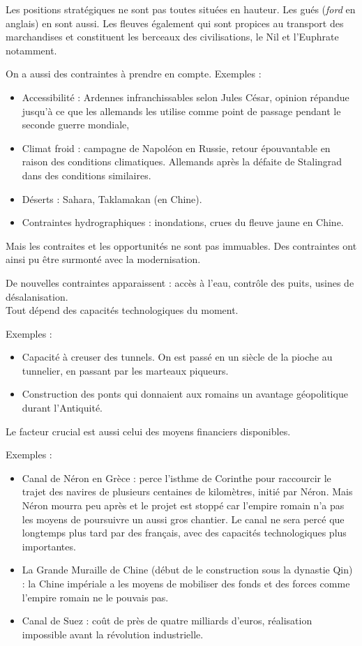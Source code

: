 \documentclass[a4paper,10pt]{article}
\begin{document}
		Les positions stratégiques ne sont pas toutes situées en hauteur.
		Les gués (\textit{ford} en anglais) en sont aussi.
		Les fleuves également qui sont propices au transport des marchandises et constituent les berceaux des civilisations, le Nil et l'Euphrate notamment.

		On a aussi des contraintes à prendre en compte.
		Exemples :
		\begin{itemize}
		\item Accessibilité : Ardennes infranchissables selon Jules César, opinion répandue jusqu'à ce que les allemands les utilise comme point de passage pendant le seconde guerre mondiale,
		\item Climat froid : campagne de Napoléon en Russie, retour épouvantable en raison des conditions climatiques. Allemands après la défaite de Stalingrad dans des conditions similaires.
		\item Déserts : Sahara, Taklamakan (en Chine).
		\item Contraintes hydrographiques : inondations, crues du fleuve jaune en Chine.
		\end{itemize}

		Mais les contraites et les opportunités ne sont pas immuables.
		Des contraintes ont ainsi pu être surmonté avec la modernisation.

		De nouvelles contraintes apparaissent : accès à l'eau, contrôle des puits, usines de désalanisation.\\

		Tout dépend des capacités technologiques du moment.

		Exemples :
		\begin{itemize}
		\item Capacité à creuser des tunnels.
				On est passé en un siècle de la pioche au tunnelier, en passant par les marteaux piqueurs.
		\item Construction des ponts qui donnaient aux romains un avantage géopolitique durant l'Antiquité.\\
		\end{itemize}

		Le facteur crucial est aussi celui des moyens financiers disponibles.

		Exemples :
		\begin{itemize}
		\item Canal de Néron en Grèce : perce l'isthme de Corinthe pour raccourcir le trajet des navires de plusieurs centaines de kilomètres, initié par Néron.
			Mais Néron mourra peu après et le projet est stoppé car l'empire romain n'a pas les moyens de poursuivre un aussi gros chantier.
			Le canal ne sera percé que longtemps plus tard par des français, avec des capacités technologiques plus importantes.
		\item La Grande Muraille de Chine (début de le construction sous la dynastie Qin) :
			la Chine impériale a les moyens de mobiliser des fonds et des forces comme l'empire romain ne le pouvais pas.
		\item Canal de Suez : coût de près de quatre milliards d'euros, réalisation impossible avant la révolution industrielle.\\
		\end{itemize}
\end{document}
